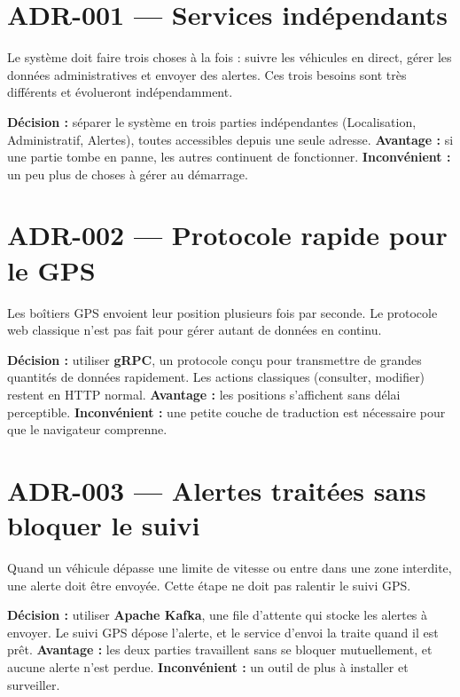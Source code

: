 \documentclass[10pt,a4paper]{article}
\begin{document}

\section{ADR-001 — Services indépendants}

Le système doit faire trois choses à la fois : suivre les véhicules en direct, gérer les données administratives et envoyer des alertes. Ces trois besoins sont très différents et évolueront indépendamment.

\textbf{Décision :} séparer le système en trois parties indépendantes (Localisation, Administratif, Alertes), toutes accessibles depuis une seule adresse. \textbf{Avantage :} si une partie tombe en panne, les autres continuent de fonctionner. \textbf{Inconvénient :} un peu plus de choses à gérer au démarrage.



\section{ADR-002 — Protocole rapide pour le GPS}

Les boîtiers GPS envoient leur position plusieurs fois par seconde. Le protocole web classique n'est pas fait pour gérer autant de données en continu.

\textbf{Décision :} utiliser \textbf{gRPC}, un protocole conçu pour transmettre de grandes quantités de données rapidement. Les actions classiques (consulter, modifier) restent en HTTP normal. \textbf{Avantage :} les positions s'affichent sans délai perceptible. \textbf{Inconvénient :} une petite couche de traduction est nécessaire pour que le navigateur comprenne.



\section{ADR-003 — Alertes traitées sans bloquer le suivi}

Quand un véhicule dépasse une limite de vitesse ou entre dans une zone interdite, une alerte doit être envoyée. Cette étape ne doit pas ralentir le suivi GPS.

\textbf{Décision :} utiliser \textbf{Apache Kafka}, une file d'attente qui stocke les alertes à envoyer. Le suivi GPS dépose l'alerte, et le service d'envoi la traite quand il est prêt. \textbf{Avantage :} les deux parties travaillent sans se bloquer mutuellement, et aucune alerte n'est perdue. \textbf{Inconvénient :} un outil de plus à installer et surveiller.
\end{document}
